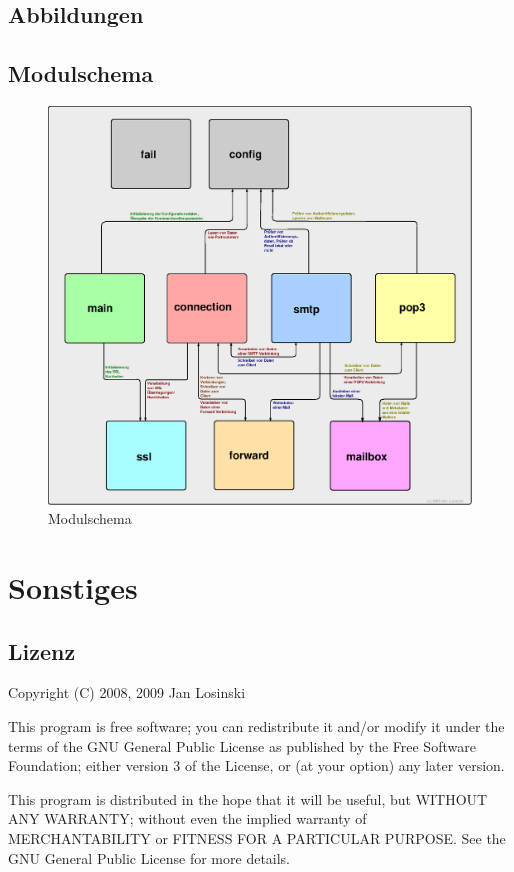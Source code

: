 \documentclass[final,a4paper,11pt,notitlepage,halfparskip]{scrreprt}
\begin{document}
\begin{appendix}
  \chapter{Abbildungen}
  \section{Modulschema}
  \begin{figure}[htb]
    \includegraphics[width=\textwidth]{schema.eps}
    \caption{Modulschema}
    \label{fig:schema}
  \end{figure}
\end{appendix}
\chapter{Sonstiges}
\section{Lizenz}
Copyright (C) 2008, 2009 Jan Losinski

This program is free software; you can redistribute it and/or modify it under
the terms of the GNU General Public License as published by the Free Software 
Foundation; either version 3 of the License, or (at your option) any later 
version.

This program is distributed in the hope that it will be useful, but WITHOUT ANY 
WARRANTY; without even the implied warranty of MERCHANTABILITY or FITNESS FOR A 
PARTICULAR PURPOSE. See the GNU General Public License for more details.
\end{document}
